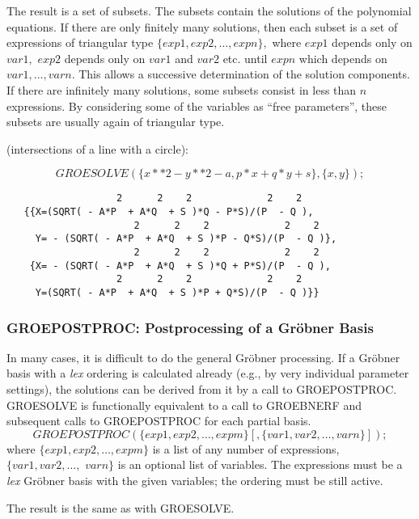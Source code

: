 The result is a set of subsets. The subsets contain the solutions of the
polynomial equations. If there are only finitely many solutions,
then each subset is a set of expressions of triangular type
$\{exp1, exp2,\ldots , expn\},$ where $exp1$ depends only on
$var1,$ $exp2$ depends only on $var1$ and $var2$ etc. until $expn$ which
depends on $var1,\ldots,varn.$ This allows a successive determination of
the solution components. If there are infinitely many solutions,
some subsets consist in less than $n$ expressions. By considering some
of the variables as ``free parameters'',  these subsets are usually
again of triangular type.


\example (intersections of a line with a circle):

\[
GROESOLVE(\{x**2 - y**2 - a, p*x+q*y+s\},\{x,y\});
\]
\begin{verbatim}
                   2      2    2             2    2
   {{X=(SQRT( - A*P  + A*Q  + S )*Q - P*S)/(P  - Q ),
                      2      2    2             2    2
     Y= - (SQRT( - A*P  + A*Q  + S )*P - Q*S)/(P  - Q )},
                      2      2    2             2    2
    {X= - (SQRT( - A*P  + A*Q  + S )*Q + P*S)/(P  - Q ),
                   2      2    2             2    2
     Y=(SQRT( - A*P  + A*Q  + S )*P + Q*S)/(P  - Q )}}
\end{verbatim}
\subsubsection{GROEPOSTPROC: Postprocessing of a Gr\"obner Basis}
In many cases, it is difficult to do the general Gr\"obner processing.
If a Gr\"obner basis with a {\it lex} ordering is calculated already (e.g.,
by very individual parameter settings), the solutions can be derived
from it by a call to GROEPOSTPROC. GROESOLVE is functionally
equivalent to a call to GROEBNERF and subsequent calls to
GROEPOSTPROC for each partial basis.
\[
 GROEPOSTPROC(\{exp1, exp2, \ldots , expm\}[,\{var1, var2, \ldots ,
varn\}]);
\]
where $\{exp1, exp2, \ldots , expm\}$ is a list of any number of
expressions, \linebreak[4] $\{var1, var2, \ldots ,$ $ varn\}$ is an
optional list of variables. The expressions must be a {\it lex} Gr\"obner
basis with the given variables; the ordering must be still active.

The result is the same as with GROESOLVE.

